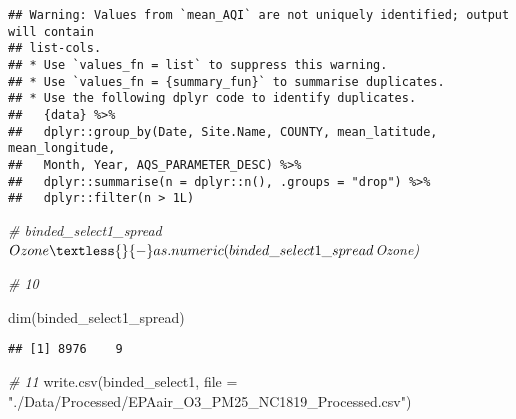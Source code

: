 \documentclass[
]{article}
\newenvironment{Shaded}{\begin{snugshade}}{\end{snugshade}}
\newcommand{\AttributeTok}[1]{\textcolor[rgb]{0.77,0.63,0.00}{#1}}
\newcommand{\CommentTok}[1]{\textcolor[rgb]{0.56,0.35,0.01}{\textit{#1}}}
\newcommand{\FunctionTok}[1]{\textcolor[rgb]{0.00,0.00,0.00}{#1}}
\newcommand{\NormalTok}[1]{#1}
\newcommand{\OtherTok}[1]{\textcolor[rgb]{0.56,0.35,0.01}{#1}}
\newcommand{\SpecialCharTok}[1]{\textcolor[rgb]{0.00,0.00,0.00}{#1}}
\newcommand{\StringTok}[1]{\textcolor[rgb]{0.31,0.60,0.02}{#1}}
\begin{document}
\begin{Shaded}
\end{Shaded}

\begin{verbatim}
## Warning: Values from `mean_AQI` are not uniquely identified; output will contain
## list-cols.
## * Use `values_fn = list` to suppress this warning.
## * Use `values_fn = {summary_fun}` to summarise duplicates.
## * Use the following dplyr code to identify duplicates.
##   {data} %>%
##   dplyr::group_by(Date, Site.Name, COUNTY, mean_latitude, mean_longitude,
##   Month, Year, AQS_PARAMETER_DESC) %>%
##   dplyr::summarise(n = dplyr::n(), .groups = "drop") %>%
##   dplyr::filter(n > 1L)
\end{verbatim}

\begin{Shaded}
\begin{Highlighting}[]
\CommentTok{\# binded\_select1\_spread$Ozone \textless{}{-} as.numeric(binded\_select1\_spread$Ozone)}

\CommentTok{\# 10}

\FunctionTok{dim}\NormalTok{(binded\_select1\_spread)}
\end{Highlighting}
\end{Shaded}

\begin{verbatim}
## [1] 8976    9
\end{verbatim}

\begin{Shaded}
\begin{Highlighting}[]
\CommentTok{\# 11}
\FunctionTok{write.csv}\NormalTok{(binded\_select1, }\AttributeTok{file =} \StringTok{"./Data/Processed/EPAair\_O3\_PM25\_NC1819\_Processed.csv"}\NormalTok{)}
\end{Highlighting}
\end{Shaded}
\end{document}
